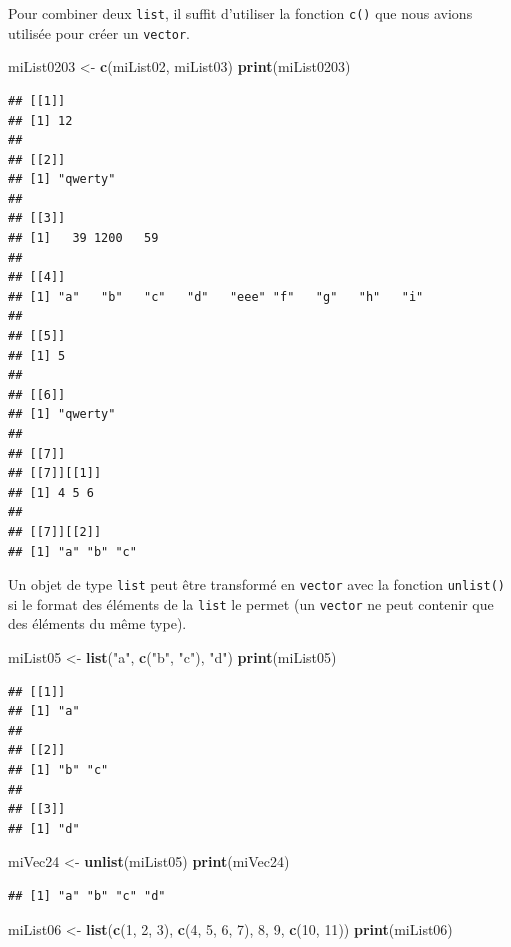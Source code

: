 \documentclass[
]{book}
\newenvironment{Shaded}{\begin{snugshade}}{\end{snugshade}}
\newcommand{\DecValTok}[1]{\textcolor[rgb]{0.00,0.00,0.81}{#1}}
\newcommand{\KeywordTok}[1]{\textcolor[rgb]{0.13,0.29,0.53}{\textbf{#1}}}
\newcommand{\NormalTok}[1]{#1}
\newcommand{\StringTok}[1]{\textcolor[rgb]{0.31,0.60,0.02}{#1}}
\begin{document}
Pour combiner deux \texttt{list}, il suffit d'utiliser la fonction \texttt{c()} que nous avions utilisée pour créer un \texttt{vector}.

\begin{Shaded}
\begin{Highlighting}[]
\NormalTok{miList0203 <-}\StringTok{ }\KeywordTok{c}\NormalTok{(miList02, miList03)}
\KeywordTok{print}\NormalTok{(miList0203)}
\end{Highlighting}
\end{Shaded}

\begin{verbatim}
## [[1]]
## [1] 12
## 
## [[2]]
## [1] "qwerty"
## 
## [[3]]
## [1]   39 1200   59
## 
## [[4]]
## [1] "a"   "b"   "c"   "d"   "eee" "f"   "g"   "h"   "i"  
## 
## [[5]]
## [1] 5
## 
## [[6]]
## [1] "qwerty"
## 
## [[7]]
## [[7]][[1]]
## [1] 4 5 6
## 
## [[7]][[2]]
## [1] "a" "b" "c"
\end{verbatim}

Un objet de type \texttt{list} peut être transformé en \texttt{vector} avec la fonction \texttt{unlist()} si le format des éléments de la \texttt{list} le permet (un \texttt{vector} ne peut contenir que des éléments du même type).

\begin{Shaded}
\begin{Highlighting}[]
\NormalTok{miList05 <-}\StringTok{ }\KeywordTok{list}\NormalTok{(}\StringTok{"a"}\NormalTok{, }\KeywordTok{c}\NormalTok{(}\StringTok{"b"}\NormalTok{, }\StringTok{"c"}\NormalTok{), }\StringTok{"d"}\NormalTok{)}
\KeywordTok{print}\NormalTok{(miList05)}
\end{Highlighting}
\end{Shaded}

\begin{verbatim}
## [[1]]
## [1] "a"
## 
## [[2]]
## [1] "b" "c"
## 
## [[3]]
## [1] "d"
\end{verbatim}

\begin{Shaded}
\begin{Highlighting}[]
\NormalTok{miVec24 <-}\StringTok{ }\KeywordTok{unlist}\NormalTok{(miList05)}
\KeywordTok{print}\NormalTok{(miVec24)}
\end{Highlighting}
\end{Shaded}

\begin{verbatim}
## [1] "a" "b" "c" "d"
\end{verbatim}

\begin{Shaded}
\begin{Highlighting}[]
\NormalTok{miList06 <-}\StringTok{ }\KeywordTok{list}\NormalTok{(}\KeywordTok{c}\NormalTok{(}\DecValTok{1}\NormalTok{, }\DecValTok{2}\NormalTok{, }\DecValTok{3}\NormalTok{), }\KeywordTok{c}\NormalTok{(}\DecValTok{4}\NormalTok{, }\DecValTok{5}\NormalTok{, }\DecValTok{6}\NormalTok{, }\DecValTok{7}\NormalTok{), }\DecValTok{8}\NormalTok{, }\DecValTok{9}\NormalTok{, }\KeywordTok{c}\NormalTok{(}\DecValTok{10}\NormalTok{, }\DecValTok{11}\NormalTok{))}
\KeywordTok{print}\NormalTok{(miList06)}
\end{Highlighting}
\end{Shaded}
\end{document}
